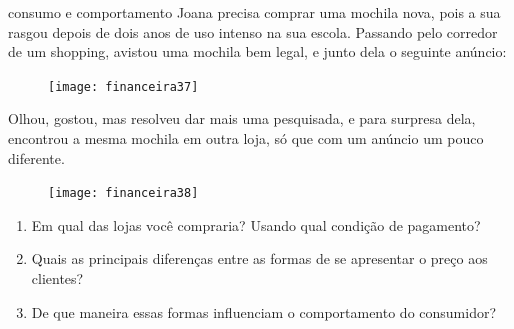 \begin{task}{consumo e comportamento}
\label{consumo-comportamento}
Joana precisa comprar uma mochila nova, pois a sua rasgou depois de dois anos de uso intenso na sua escola. Passando pelo corredor de um shopping, avistou uma mochila bem legal, e junto dela o seguinte anúncio:

\begin{figure}[H]
\centering

\texttt{[image: financeira37]}
\end{figure}

Olhou, gostou, mas resolveu dar mais uma pesquisada, e para surpresa dela, encontrou a mesma mochila em outra loja, só que com um anúncio um pouco diferente.

\begin{figure}[H]
\centering

\texttt{[image: financeira38]}
\end{figure}

\begin{enumerate}
  \item Em qual das lojas você compraria? Usando qual condição de pagamento?
  \item Quais as principais diferenças entre as formas de se apresentar o preço aos clientes?
  \item De que maneira essas formas influenciam o comportamento do consumidor?
\end{enumerate}
\end{task}

